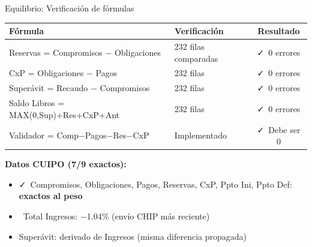 \documentclass[aspectratio=169,11pt]{beamer}
\newcommand{\cmark}{\textcolor{verde}{\faCheck}}
\newcommand{\wmark}{\textcolor{amber}{\faExclamationTriangle}}
\begin{document}
\begin{frame}{Equilibrio: Verificaci\'on de f\'ormulas}
\footnotesize
\renewcommand{\arraystretch}{1.3}
\begin{center}
\begin{tabular}{l l c}
\toprule
\textbf{F\'ormula} & \textbf{Verificaci\'on} & \textbf{Resultado} \\
\midrule
Reservas = Compromisos $-$ Obligaciones & 232 filas comparadas & \cmark\ 0 errores \\
CxP = Obligaciones $-$ Pagos & 232 filas & \cmark\ 0 errores \\
Super\'avit = Recaudo $-$ Compromisos & 232 filas & \cmark\ 0 errores \\
Saldo Libros = MAX(0,Sup)+Res+CxP+Ant & 232 filas & \cmark\ 0 errores \\
Validador = Comp$-$Pagos$-$Res$-$CxP & Implementado & \cmark\ Debe ser 0 \\
\bottomrule
\end{tabular}
\end{center}

\vspace{10pt}
\textbf{Datos CUIPO (7/9 exactos):}
\begin{itemize}\setlength{\itemsep}{0pt}
    \item \cmark\ Compromisos, Obligaciones, Pagos, Reservas, CxP, Ppto Ini, Ppto Def: \textbf{exactos al peso}
    \item \wmark\ Total Ingresos: $-$1.04\% (env\'io CHIP m\'as reciente)
    \item Super\'avit: derivado de Ingresos (misma diferencia propagada)
\end{itemize}
\end{frame}
\end{document}
